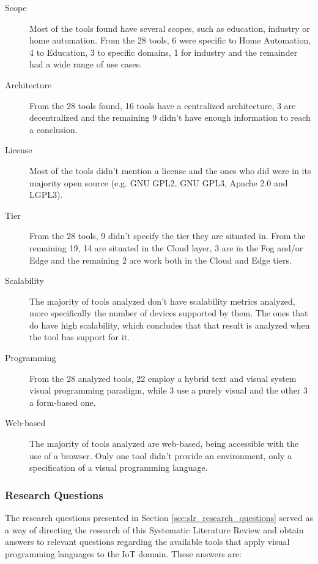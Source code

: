 \begin{description}
    \item [Scope] Most of the tools found have several scopes, such as education, industry or home automation. From the 28 tools, 6 were specific to Home Automation, 4 to Education, 3 to specific domains, 1 for industry and the remainder had a wide range of use cases.
    \item [Architecture] From the 28 tools found, 16 tools have a centralized architecture, 3 are decentralized and the remaining 9 didn't have enough information to reach a conclusion.
    \item [License] Most of the tools didn't mention a license and the ones who did were in its majority open source (e.g. GNU GPL2, GNU GPL3, Apache 2.0 and LGPL3). 
    \item [Tier] From the 28 tools, 9 didn't specify the tier they are situated in. From the remaining 19, 14 are situated in the Cloud layer, 3 are in the Fog and/or Edge and the remaining 2 are work both in the Cloud and Edge tiers.
    \item [Scalability] The majority of tools analyzed don't have scalability metrics analyzed, more specifically the number of devices supported by them. The ones that do have high scalability, which concludes that that result is analyzed when the tool has support for it.
    \item [Programming] From the 28 analyzed tools, 22 employ a hybrid text and visual system visual programming paradigm, while 3 use a purely visual and the other 3 a form-based one. 
    \item [Web-based] The majority of tools analyzed are web-based, being accessible with the use of a browser. Only one tool didn't provide an environment, only a specification of a visual programming language.
\end{description}

\subsubsection{Research Questions}\label{sec:answer_slr_research_questions}

The research questions presented in Section \ref{sec:slr_research_questions} served as a way of directing the research of this Systematic Literature Review and obtain answers to relevant questions regarding the available tools that apply visual programming languages to the IoT domain. These answers are:

